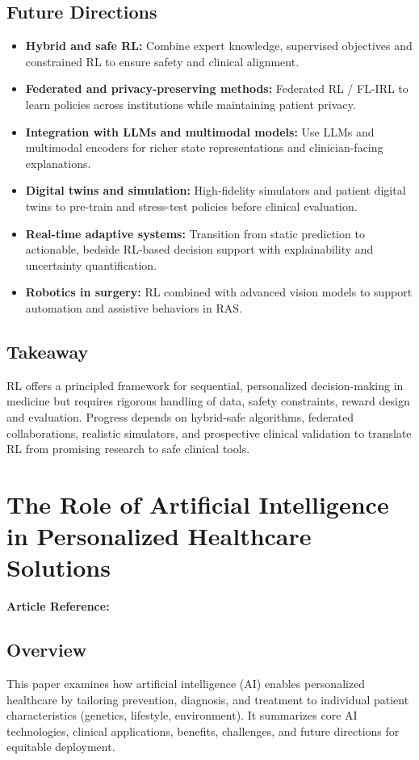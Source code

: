 \subsection*{Future Directions}
\begin{itemize}
    \item \textbf{Hybrid and safe RL:} Combine expert knowledge, supervised objectives and constrained RL to ensure safety and clinical alignment.
    \item \textbf{Federated and privacy-preserving methods:} Federated RL / FL-IRL to learn policies across institutions while maintaining patient privacy.
    \item \textbf{Integration with LLMs and multimodal models:} Use LLMs and multimodal encoders for richer state representations and clinician-facing explanations.
    \item \textbf{Digital twins and simulation:} High‑fidelity simulators and patient digital twins to pre-train and stress-test policies before clinical evaluation.
    \item \textbf{Real-time adaptive systems:} Transition from static prediction to actionable, bedside RL-based decision support with explainability and uncertainty quantification.
    \item \textbf{Robotics in surgery:} RL combined with advanced vision models to support automation and assistive behaviors in RAS.
\end{itemize}

\subsection*{Takeaway}
RL offers a principled framework for sequential, personalized decision-making in medicine but requires rigorous handling of data, safety constraints, reward design and evaluation. Progress depends on hybrid-safe algorithms, federated collaborations, realistic simulators, and prospective clinical validation to translate RL from promising research to safe clinical tools.

\section{The Role of Artificial Intelligence in Personalized Healthcare Solutions}
\textbf{Article Reference:} \cite{PDFRoleArtificial}

\subsection*{Overview}
This paper examines how artificial intelligence (AI) enables personalized healthcare by tailoring prevention, diagnosis, and treatment to individual patient characteristics (genetics, lifestyle, environment). It summarizes core AI technologies, clinical applications, benefits, challenges, and future directions for equitable deployment.

